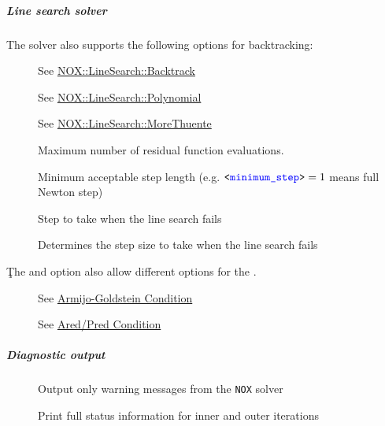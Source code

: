 \subparagraph{Line search solver}
The  solver also supports the following options for backtracking:
\begin{description}
\item[] See \href{https://docs.trilinos.org/latest-release/packages/nox/doc/html/classNOX_1_1LineSearch_1_1Backtrack.html}{NOX::LineSearch::Backtrack}
\item[] See \href{https://docs.trilinos.org/latest-release/packages/nox/doc/html/classNOX_1_1LineSearch_1_1Polynomial.html}{NOX::LineSearch::Polynomial}
\item[] See \href{https://docs.trilinos.org/latest-release/packages/nox/doc/html/classNOX_1_1LineSearch_1_1MoreThuente.html}{NOX::LineSearch::MoreThuente}
\end{description}
\begin{description}
\item[] Maximum number of residual function evaluations.
\item[] Minimum acceptable step length (e.g. $\texttt{<\textcolor{blue}{minimum\_step}>} = 1$ means full Newton step)
\item[] Step to take when the line search fails
\item[] Determines the step size to take when the line search fails
\end{description}
Ţhe  and  option also allow different options for the .
\begin{description}
\item[] See \href{https://docs.trilinos.org/latest-release/packages/nox/doc/html/classNOX_1_1LineSearch_1_1MoreThuente.html}{Armijo-Goldstein Condition}
\item[] See \href{https://docs.trilinos.org/latest-release/packages/nox/doc/html/classNOX_1_1LineSearch_1_1MoreThuente.html}{Ared/Pred Condition}
\end{description}
\subparagraph{Diagnostic output}
\begin{description}
\item[] Output only warning messages from the \verb;NOX; solver
\item[] Print full status information for inner and outer iterations
\end{description}

